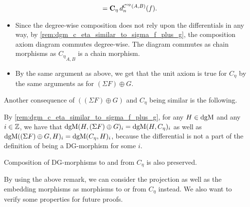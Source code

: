 \begin{remark}
\begin{itemize}
{\begin{align*}
                &= \operatorname{\mathbf{C}}_{\eta} d_n^{{\mathcal{C}}^{\operatorname{op}}(A, B)}(f).
            \end{align*}
        }
        \item {
            Since the degree-wise composition does not rely upon the differentials in any way, by \autoref{rem:dgm_c_eta_similar_to_sigma_f_plus_g},
            the composition axiom diagram commutes degree-wise. The diagram commutes as chain morphisms as \( {C_{\eta}}_{A, B} \) is a chain morphism.
        }
        \item {
            By the same argument as above, we get that the unit axiom is true for \( C_{\eta} \) by the same arguments as for \( (\Sigma F) \oplus G \).
        }
    \end{itemize}
\end{remark}

Another consequence of \( ((\Sigma F) \oplus G) \) and \( C_{\eta} \) being similar is the following.

\begin{remark}
    \label{rem:dgm_different_dg_morphisms_same_space_give_degree-wise_same_morphisms}
    By \autoref{rem:dgm_c_eta_similar_to_sigma_f_plus_g}, for any \( H \in \operatorname{dgM} \) and any \( i \in {\mathbb{Z}} \), we have that \( \operatorname{dgM}(H, (\Sigma F) \oplus G)_i = \operatorname{dgM}(H, C_{\eta})_i \) as well as \( \operatorname{dgM}((\Sigma F) \oplus G, H)_i = \operatorname{dgM}(C_{\eta}, H)_i \), because the differential is not a part of the definition of being a DG-morphism for some \( i \).

    Composition of DG-morphisms to and from \( C_{\eta} \) is also preserved.
\end{remark}

By using the above remark, we can consider the projection as well as the embedding morphisms as morphisms to or from \( C_{\eta} \) instead. We also want to verify some properties for future proofs.

